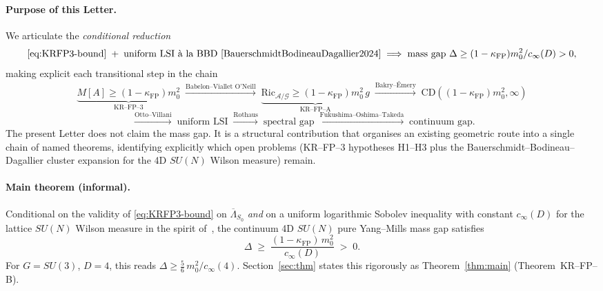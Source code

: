 \documentclass[11pt,a4paper]{amsart}
\theoremstyle{definition}
\newcommand{\Ric}{\mathrm{Ric}}
\newcommand{\kFP}{\kappa_{\mathrm{FP}}}
\newcommand{\cinf}{c_{\infty}}
\begin{document}
\paragraph{Purpose of this Letter.} We articulate the
\emph{conditional reduction}
$$
\eqref{eq:KRFP3-bound}\;+\;
\text{uniform LSI \`a la BBD~\cite{BauerschmidtBodineauDagallier2024}}
\;\Longrightarrow\;
\text{mass gap }\Delta \geq (1-\kFP) m_0^2 / \cinf(D) > 0,
$$
making explicit each transitional step in the chain
$$
\underbrace{M[A]\geq(1-\kFP)m_0^2}_{\text{KR--FP--3}}
\;\xrightarrow{\text{Babelon--Viallet O'Neill}}\;
\underbrace{\Ric_{\mathcal A/\mathcal G}\geq(1-\kFP) m_0^2\,g}_{\text{KR--FP--A}}
\;\xrightarrow{\text{Bakry--\'Emery}}\;
\text{CD}((1-\kFP) m_0^2,\infty)
$$
$$
\;\xrightarrow{\text{Otto--Villani}}\;
\text{uniform LSI}
\;\xrightarrow{\text{Rothaus}}\;
\text{spectral gap}
\;\xrightarrow{\text{Fukushima--Oshima--Takeda}}\;
\text{continuum gap.}
$$
The present Letter does not claim the mass gap. It is a structural
contribution that organises an existing geometric route into a single
chain of named theorems, identifying explicitly which open problems
(KR--FP--3 hypotheses H1--H3 plus the Bauerschmidt--Bodineau--Dagallier
cluster expansion for the 4D $SU(N)$ Wilson measure) remain.

\paragraph{Main theorem (informal).} Conditional on the validity of
\eqref{eq:KRFP3-bound} on $\overline\Lambda_{S_0}$ \emph{and} on a uniform
logarithmic Sobolev inequality with constant $\cinf(D)$ for the lattice
$SU(N)$ Wilson measure in the spirit of~\cite{BauerschmidtBodineauDagallier2024,
BauerschmidtDagallier2024}, the continuum 4D $SU(N)$ pure Yang--Mills mass gap
satisfies
\begin{equation}\label{eq:main-informal}
\Delta \;\geq\; \frac{(1-\kFP)\, m_0^2}{\cinf(D)} \;>\; 0.
\end{equation}
For $G = SU(3)$, $D = 4$, this reads $\Delta \geq \tfrac{5}{6}\,m_0^2/\cinf(4)$.
Section~\ref{sec:thm} states this rigorously as
Theorem~\ref{thm:main} (Theorem~KR--FP--B).
\end{document}
